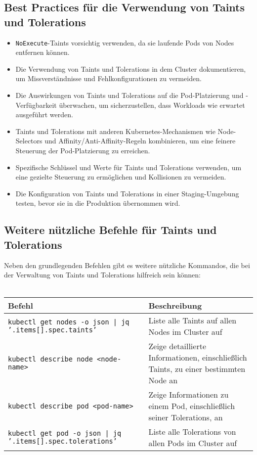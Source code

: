 \subsection{Best Practices für die Verwendung von Taints und Tolerations}
\begin{itemize}
    \item \texttt{NoExecute}-Taints vorsichtig verwenden, da sie laufende Pods von Nodes entfernen können.
    \item Die Verwendung von Taints und Tolerations in dem Cluster dokumentieren, um Missverständnisse und Fehlkonfigurationen zu vermeiden.
    \item Die Auswirkungen von Taints und Tolerations auf die Pod-Platzierung und -Verfügbarkeit überwachen, um sicherzustellen, dass Workloads wie erwartet ausgeführt werden.
    \item Taints und Tolerations mit anderen Kubernetes-Mechanismen wie Node-Selectors und Affinity/Anti-Affinity-Regeln kombinieren, um eine feinere Steuerung der Pod-Platzierung zu erreichen.
    \item Spezifische Schlüssel und Werte für Taints und Tolerations verwenden, um eine gezielte Steuerung zu ermöglichen und Kollisionen zu vermeiden.
    \item Die Konfiguration von Taints und Tolerations in einer Staging-Umgebung testen, bevor sie in die Produktion übernommen wird.

\end{itemize}

\subsection{Weitere nützliche Befehle für Taints und Tolerations}
Neben den grundlegenden Befehlen gibt es weitere nützliche Kommandos, die bei der Verwaltung von Taints und Tolerations hilfreich sein können:\\
\phantom{.}\\
\begin{tabular}{|p{}|p{}|}
\hline
\textbf{Befehl} & \textbf{Beschreibung} \\
\hline
\texttt{kubectl get nodes -o json | jq '.items[].spec.taints'} & Liste alle Taints auf allen Nodes im Cluster auf\\
\texttt{kubectl describe node <node-name>} & Zeige detaillierte Informationen, einschließlich Taints, zu einer bestimmten Node an \\
\texttt{kubectl describe pod <pod-name>} & Zeige Informationen zu einem Pod, einschließlich seiner Tolerations, an \\
\texttt{kubectl get pod -o json | jq '.items[].spec.tolerations'} & Liste alle Tolerations von allen Pods im Cluster auf\\
\hline
\end{tabular}

